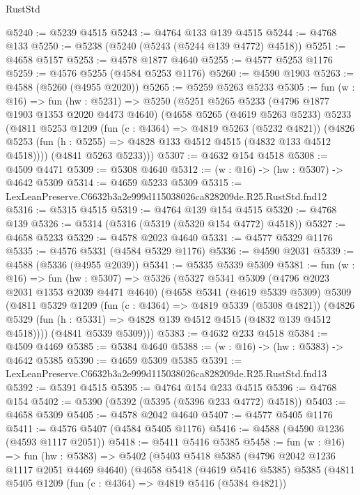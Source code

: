 \begin{lexlean}{RustStd}
\begin{coremodule}
@5240 := @5239 @4515
@5243 := @4764 @133 @139 @4515
@5244 := @4768 @133
@5250 := @5238 (@5240 (@5243 (@5244 @139 @4772) @4518))
@5251 := @4658 @5157
@5253 := @4578 @1877 @4640
@5255 := @4577 @5253 @1176
@5259 := @4576 @5255 (@4584 @5253 @1176)
@5260 := @4590 @1903
@5263 := @4588 (@5260 (@4955 @2020))
@5265 := @5259 @5263 @5233
@5305 := fun (w : @16) =>
  fun (hw : @5231) =>
  @5250
    (@5251
      @5265
      @5233
      (@4796 @1877 @1903 @1353 @2020 @4473 @4640)
      (@4658
        @5265
        (@4619 @5263 @5233)
        @5233
        (@4811
          @5253
          @1209
          (fun (c : @4364) => @4819 @5263 (@5232 @4821))
          (@4826 @5253 (fun (h : @5255) => @4828 @133 @4512 @4515 (@4832 @133 @4512 @4518))))
        (@4841 @5263 @5233)))
@5307 := @4632 @154 @4518
@5308 := @4509 @4471
@5309 := @5308 @4640
@5312 := (w : @16) -> (hw : @5307) -> @4642 @5309
@5314 := @4659 @5233 @5309
@5315 := LexLeanPreserve.C6632b3a2e999d115038026ca828209de.R25.RustStd.fnd12
@5316 := @5315 @4515
@5319 := @4764 @139 @154 @4515
@5320 := @4768 @139
@5326 := @5314 (@5316 (@5319 (@5320 @154 @4772) @4518))
@5327 := @4658 @5233
@5329 := @4578 @2023 @4640
@5331 := @4577 @5329 @1176
@5335 := @4576 @5331 (@4584 @5329 @1176)
@5336 := @4590 @2031
@5339 := @4588 (@5336 (@4955 @2039))
@5341 := @5335 @5339 @5309
@5381 := fun (w : @16) =>
  fun (hw : @5307) =>
  @5326
    (@5327
      @5341
      @5309
      (@4796 @2023 @2031 @1353 @2039 @4471 @4640)
      (@4658
        @5341
        (@4619 @5339 @5309)
        @5309
        (@4811
          @5329
          @1209
          (fun (c : @4364) => @4819 @5339 (@5308 @4821))
          (@4826 @5329 (fun (h : @5331) => @4828 @139 @4512 @4515 (@4832 @139 @4512 @4518))))
        (@4841 @5339 @5309)))
@5383 := @4632 @233 @4518
@5384 := @4509 @4469
@5385 := @5384 @4640
@5388 := (w : @16) -> (hw : @5383) -> @4642 @5385
@5390 := @4659 @5309 @5385
@5391 := LexLeanPreserve.C6632b3a2e999d115038026ca828209de.R25.RustStd.fnd13
@5392 := @5391 @4515
@5395 := @4764 @154 @233 @4515
@5396 := @4768 @154
@5402 := @5390 (@5392 (@5395 (@5396 @233 @4772) @4518))
@5403 := @4658 @5309
@5405 := @4578 @2042 @4640
@5407 := @4577 @5405 @1176
@5411 := @4576 @5407 (@4584 @5405 @1176)
@5416 := @4588 (@4590 @1236 (@4593 @1117 @2051))
@5418 := @5411 @5416 @5385
@5458 := fun (w : @16) =>
  fun (hw : @5383) =>
  @5402
    (@5403
      @5418
      @5385
      (@4796 @2042 @1236 @1117 @2051 @4469 @4640)
      (@4658
        @5418
        (@4619 @5416 @5385)
        @5385
        (@4811
          @5405
          @1209
          (fun (c : @4364) => @4819 @5416 (@5384 @4821))

\end{coremodule}
\end{lexlean}
